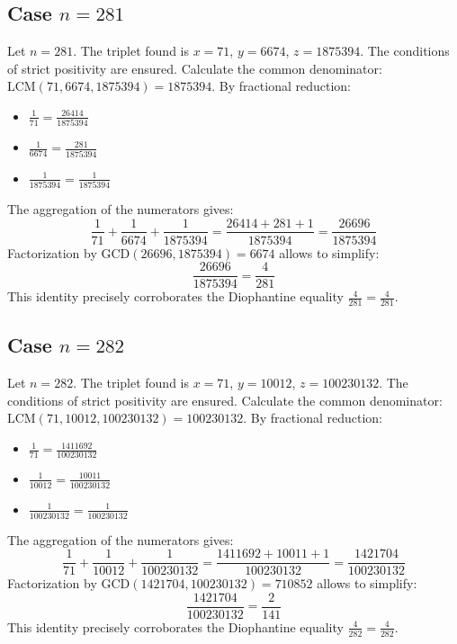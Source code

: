 \documentclass[11pt,a4paper]{article}
\begin{document}
\subsection{Case $n = 281$}
Let $n = 281$. The triplet found is $x = 71$, $y = 6674$, $z = 1875394$.
The conditions of strict positivity are ensured.
Calculate the common denominator: $\text{LCM}(71, 6674, 1875394) = 1875394$.
By fractional reduction:
\begin{itemize}
    \item $\frac{1}{71} = \frac{26414}{1875394}$
    \item $\frac{1}{6674} = \frac{281}{1875394}$
    \item $\frac{1}{1875394} = \frac{1}{1875394}$
\end{itemize}
The aggregation of the numerators gives:
$$ \frac{1}{71} + \frac{1}{6674} + \frac{1}{1875394} = \frac{26414 + 281 + 1}{1875394} = \frac{26696}{1875394} $$
Factorization by $\text{GCD}(26696, 1875394) = 6674$ allows to simplify:
$$ \frac{26696}{1875394} = \frac{4}{281} $$
This identity precisely corroborates the Diophantine equality $\frac{4}{281} = \frac{4}{281}$.

\subsection{Case $n = 282$}
Let $n = 282$. The triplet found is $x = 71$, $y = 10012$, $z = 100230132$.
The conditions of strict positivity are ensured.
Calculate the common denominator: $\text{LCM}(71, 10012, 100230132) = 100230132$.
By fractional reduction:
\begin{itemize}
    \item $\frac{1}{71} = \frac{1411692}{100230132}$
    \item $\frac{1}{10012} = \frac{10011}{100230132}$
    \item $\frac{1}{100230132} = \frac{1}{100230132}$
\end{itemize}
The aggregation of the numerators gives:
$$ \frac{1}{71} + \frac{1}{10012} + \frac{1}{100230132} = \frac{1411692 + 10011 + 1}{100230132} = \frac{1421704}{100230132} $$
Factorization by $\text{GCD}(1421704, 100230132) = 710852$ allows to simplify:
$$ \frac{1421704}{100230132} = \frac{2}{141} $$
This identity precisely corroborates the Diophantine equality $\frac{4}{282} = \frac{4}{282}$.
\end{document}
